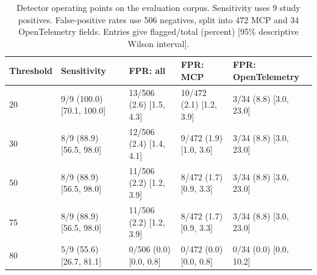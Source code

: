 \begin{table}[t]\centering\scriptsize\setlength{\tabcolsep}{3pt}
\caption{Detector operating points on the evaluation corpus. Sensitivity uses 9 study positives. False-positive rates use 506 negatives, split into 472 MCP and 34 OpenTelemetry fields. Entries give flagged/total (percent) [95\% descriptive Wilson interval].}\label{tab:defense-thresholds}
\begin{tabular}{@{}lllll@{}}
\toprule
Threshold & Sensitivity & FPR: all & FPR: MCP & FPR: OpenTelemetry \\\midrule
20 & 9/9 (100.0) [70.1, 100.0] & 13/506 (2.6) [1.5, 4.3] & 10/472 (2.1) [1.2, 3.9] & 3/34 (8.8) [3.0, 23.0] \\
30 & 8/9 (88.9) [56.5, 98.0] & 12/506 (2.4) [1.4, 4.1] & 9/472 (1.9) [1.0, 3.6] & 3/34 (8.8) [3.0, 23.0] \\
50 & 8/9 (88.9) [56.5, 98.0] & 11/506 (2.2) [1.2, 3.9] & 8/472 (1.7) [0.9, 3.3] & 3/34 (8.8) [3.0, 23.0] \\
75 & 8/9 (88.9) [56.5, 98.0] & 11/506 (2.2) [1.2, 3.9] & 8/472 (1.7) [0.9, 3.3] & 3/34 (8.8) [3.0, 23.0] \\
80 & 5/9 (55.6) [26.7, 81.1] & 0/506 (0.0) [0.0, 0.8] & 0/472 (0.0) [0.0, 0.8] & 0/34 (0.0) [0.0, 10.2] \\
\bottomrule
\end{tabular}\end{table}
